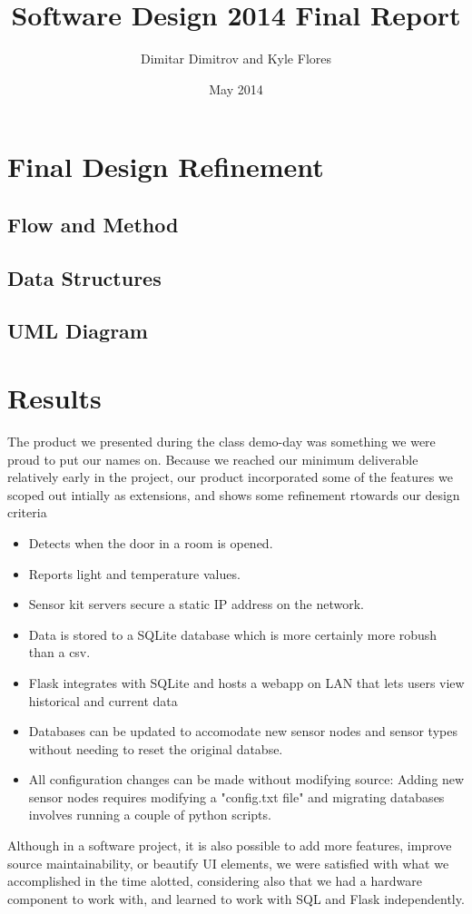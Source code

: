 \documentclass{article}
\title{Software Design 2014 Final Report}
\author{Dimitar Dimitrov and Kyle Flores}
\date{May 2014}
\begin{document}
\maketitle

\section*{Final Design Refinement}
\subsection*{Flow and Method}

\subsection*{Data Structures}

\subsection*{UML Diagram}

\section*{Results}
\par The product we presented during the class demo-day was something we were proud to put our names on. Because we reached our minimum deliverable relatively early in the project, our product incorporated some of the features we scoped out intially as extensions, and shows some refinement rtowards our design criteria
\begin{itemize}
 \item Detects when the door in a room is opened.
 \item Reports light and temperature values.
 \item Sensor kit servers secure a static IP address on the network.
 \item Data is stored to a SQLite database which is more certainly more robush than a csv.
 \item Flask integrates with SQLite and hosts a webapp on LAN that lets users view historical and current data
 \item Databases can be updated to accomodate new sensor nodes and sensor types without needing to reset the original databse.
 \item All configuration changes can be made without modifying source: Adding new sensor nodes requires modifying a "config.txt file" and migrating databases involves running a couple of python scripts.
\end{itemize}
Although in a software project, it is also possible to add more features, improve source maintainability, or beautify UI elements, we were satisfied with what we accomplished in the time alotted, considering also that we had a hardware component to work with, and learned to work with SQL and Flask independently.
\end{document}
